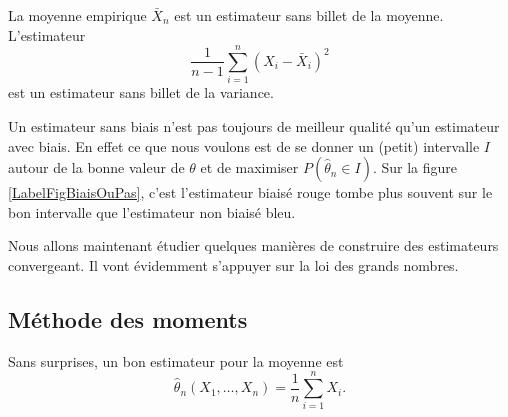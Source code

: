 \begin{example}
    La moyenne empirique \( \bar X_n\) est un estimateur sans billet de la moyenne. L'estimateur
    \begin{equation}
        \frac{1}{ n-1 }\sum_{i=1}^n(X_i-\bar X_i)^2
    \end{equation}
    est un estimateur sans billet de la variance.
\end{example}

Un estimateur sans biais n'est pas toujours de meilleur qualité qu'un estimateur avec biais. En effet ce que nous voulons est de se donner un (petit) intervalle  \( I\) autour de la bonne valeur de \( \theta\) et de maximiser \( P(\hat\theta_n\in I)\). Sur la figure \ref{LabelFigBiaisOuPas}, c'est l'estimateur biaisé rouge tombe plus souvent sur le bon intervalle que l'estimateur non biaisé bleu.
\newcommand{\CaptionFigBiaisOuPas}{Un estimateur sans biais et un avec biais.}


Nous allons maintenant étudier quelques manières de construire des estimateurs convergeant. Il vont évidemment s'appuyer sur la loi des grands nombres.

\subsection{Méthode des moments}

Sans surprises, un bon estimateur pour la moyenne est
\begin{equation}
    \hat\theta_n(X_1,\ldots,X_n)=\frac{1}{ n }\sum_{i=1}^nX_i.
\end{equation}

